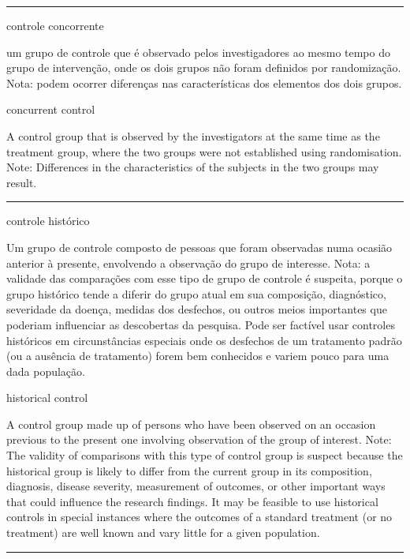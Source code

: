 \documentclass[
]{book}
\begin{document}
\begin{center}\rule{0.5\linewidth}{0.5pt}\end{center}

controle concorrente

um grupo de controle que é observado pelos investigadores ao mesmo tempo do grupo de intervenção, onde os dois grupos não foram definidos por randomização. Nota: podem ocorrer diferenças nas características dos elementos dos dois grupos.

concurrent control

A control group that is observed by the investigators at the same time as the treatment group, where the two groups were not established using randomisation. Note: Differences in the characteristics of the subjects in the two groups may result.

\begin{center}\rule{0.5\linewidth}{0.5pt}\end{center}

controle histórico

Um grupo de controle composto de pessoas que foram observadas numa ocasião anterior à presente, envolvendo a observação do grupo de interesse. Nota: a validade das comparações com esse tipo de grupo de controle é suspeita, porque o grupo histórico tende a diferir do grupo atual em sua composição, diagnóstico, severidade da doença, medidas dos desfechos, ou outros meios importantes que poderiam influenciar as descobertas da pesquisa. Pode ser factível usar controles históricos em circunstâncias especiais onde os desfechos de um tratamento padrão (ou a ausência de tratamento) forem bem conhecidos e variem pouco para uma dada população.

historical control

A control group made up of persons who have been observed on an occasion previous to the present one involving observation of the group of interest. Note: The validity of comparisons with this type of control group is suspect because the historical group is likely to differ from the current group in its composition, diagnosis, disease severity, measurement of outcomes, or other important ways that could influence the research findings. It may be feasible to use historical controls in special instances where the outcomes of a standard treatment (or no treatment) are well known and vary little for a given population.

\begin{center}\rule{0.5\linewidth}{0.5pt}\end{center}
\end{document}
